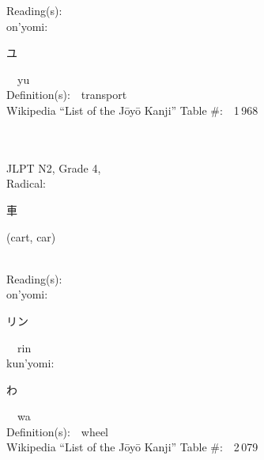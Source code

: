 \begin{multicols}{2}
Reading(s):\ \ \\
{\hspace*{1em}}on'yomi:\ \ \\
{\hspace*{2em}}{\begin{CJK}{UTF8}{min} ユ \end{CJK}}\ \ yu\ \ \\
Definition(s):\ \ transport \\
Wikipedia ``List of the J\=oy\=o Kanji'' Table \#:\ \ 1\,968 \\
\ \ \\
{\fontsize{34pt}{40pt}  }\ \ \\  %
{JLPT N2, Grade 4, \\Radical:\ \ {\begin{CJK}{UTF8}{min} 車 \end{CJK}} (cart, car) } \\
Reading(s):\ \ \\
{\hspace*{1em}}on'yomi:\ \ \\
{\hspace*{2em}}{\begin{CJK}{UTF8}{min} リン \end{CJK}}\ \ rin\ \ \\
{\hspace*{1em}}kun'yomi:\ \ \\
{\hspace*{2em}}{\begin{CJK}{UTF8}{min} わ \end{CJK}}\ \ wa\ \ \\
Definition(s):\ \ wheel \\
Wikipedia ``List of the J\=oy\=o Kanji'' Table \#:\ \ 2\,079 \\
\ \ \\
\end{multicols}



